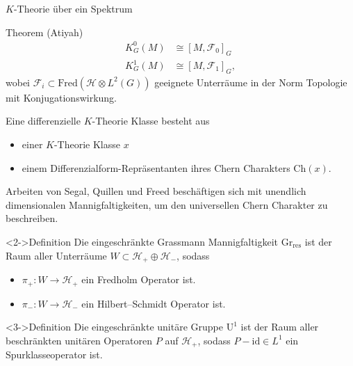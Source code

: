 \documentclass[12pt,utf8,notheorems,compress,t]{beamer}
\renewcommand{\_}{\mathpunct{.}}
\newcommand{\?}{\,{:}\,}
\newcommand{\Ch}{\mathrm{Ch}}
\begin{document}
\begin{frame}{$K$-Theorie über ein Spektrum}
    \begin{exampleblock}{Theorem (Atiyah)}{}
        \vspace{-1em}
        \begin{align*}
            K_G^0(M) &\cong [M, \mathscr{F}_0]_G \\
            K_G^1(M) &\cong [M, \mathscr{F}_1]_G,
        \end{align*}
        wobei $\mathscr{F}_i\subset \mathrm{Fred}(\mathcal{H}\otimes L^2(G))$
        geeignete Unterräume in der Norm Topologie mit Konjugationswirkung.
    \end{exampleblock}
\end{frame}
\begin{frame}
    Eine differenzielle $K$-Theorie Klasse besteht aus
    \begin{itemize}
        \item einer $K$-Theorie Klasse $x$
        \item einem Differenzialform-Repräsentanten ihres Chern Charakters
            $\Ch(x)$.
    \end{itemize}
    
\end{frame}
\begin{frame}
    Arbeiten von Segal, Quillen und Freed beschäftigen sich mit unendlich
    dimensionalen Mannigfaltigkeiten, um den universellen Chern Charakter zu
    beschreiben.
    \begin{block}<2->{Definition}
        Die eingeschränkte Grassmann Mannigfaltigkeit
        $\mathrm{Gr}_{\mathrm{res}}$ ist der Raum aller Unterräume $W\subset
        \mathcal{H}_+ \oplus \mathcal{H}_-$, sodass 
        \begin{itemize}
            \item $\pi_+\colon W\to \mathcal{H}_+$ ein Fredholm Operator ist.
            \item $\pi_-\colon W \to \mathcal{H}_-$ ein Hilbert--Schmidt
                Operator ist.
        \end{itemize}
    \end{block}
    \begin{block}<3->{Definition}
        Die eingeschränkte unitäre Gruppe $\mathrm U^1$ ist der Raum aller
        beschränkten
        unitären Operatoren $P$ auf $\mathcal{H}_+$, sodass $P-\mathrm{id}\in
        L^1$ ein Spurklasseoperator ist.
    \end{block}
\end{frame}
\end{document}
